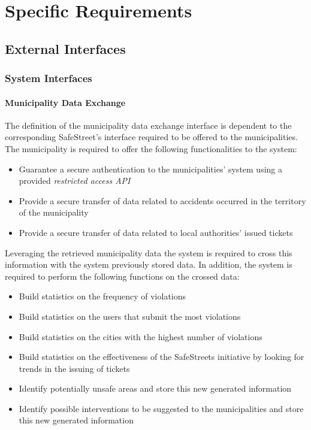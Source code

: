 \section{Specific Requirements}

\subsection{External Interfaces}

\subsubsection{System Interfaces}

\paragraph{Municipality Data Exchange} \label{p:mde} The definition of the municipality data exchange interface is dependent to the corresponding SafeStreet's interface required to be offered to the municipalities. The municipality is required to offer the following functionalities to the system:

	\begin{itemize}
		\item Guarantee a secure authentication to the municipalities' system using a provided \emph{restricted access API}
		\item Provide a secure transfer of data related to accidents occurred in the territory of the municipality
		\item Provide a secure transfer of data related to local authorities' issued tickets 
	\end{itemize} 
	
	Leveraging the retrieved municipality data the system is required to cross this information with the system previously stored data. In addition, the system is required to perform the following functions on the crossed data:
	
	\begin{itemize}
		\item Build statistics on the frequency of violations
		\item Build statistics on the users that submit the most violations
		\item Build statistics on the cities with the highest number of violations
		\item Build statistics on the effectiveness of the SafeStreets initiative by looking for trends in the issuing of tickets
		\item Identify potentially unsafe areas and store this new generated information 
		\item Identify possible interventions to be suggested to the municipalities and store this new generated information 
	\end{itemize}
		
